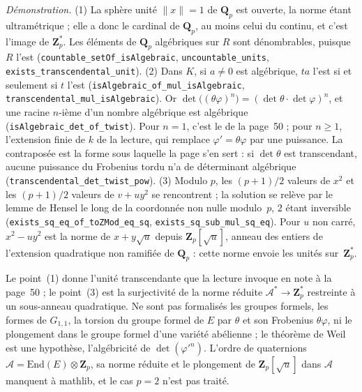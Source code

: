{\small \emph{Démonstration.} (1) La sphère unité $\lVert x \rVert = 1$ de $\mathbf Q_p$ est ouverte, la norme étant ultramétrique ; elle a donc le cardinal de $\mathbf Q_p$, au moins celui du continu, et c'est l'image de $\mathbf Z_p^*$. Les éléments de $\mathbf Q_p$ algébriques sur $R$ sont dénombrables, puisque $R$ l'est (\texttt{countable\_setOf\_isAlgebraic}, \texttt{uncountable\_units}, \texttt{exists\_transcendental\_unit}). (2) Dans $K$, si $a \neq 0$ est algébrique, $ta$ l'est si et seulement si $t$ l'est (\texttt{isAlgebraic\_of\_mul\_isAlgebraic}, \texttt{transcendental\_mul\_isAlgebraic}). Or $\det\bigl((\theta\varphi)^n\bigr) = (\det\theta \cdot \det\varphi)^n$, et une racine $n$-ième d'un nombre algébrique est algébrique (\texttt{isAlgebraic\_det\_of\_twist}). Pour $n = 1$, c'est le  de la page~50 ; pour $n \geq 1$, l'extension finie de $k$ de la lecture, qui remplace $\varphi' = \theta\varphi$ par une puissance. La contraposée est la forme sous laquelle la page s'en sert : si $\det\theta$ est transcendant, aucune puissance du Frobenius tordu n'a de déterminant algébrique (\texttt{transcendental\_det\_twist\_pow}). (3) Modulo $p$, les $(p+1)/2$ valeurs de $x^2$ et les $(p+1)/2$ valeurs de $v + u y^2$ se rencontrent ; la solution se relève par le lemme de Hensel le long de la coordonnée non nulle modulo~$p$, $2$ étant inversible (\texttt{exists\_sq\_eq\_of\_toZMod\_eq\_sq}, \texttt{exists\_sq\_sub\_mul\_sq\_eq}). Pour $u$ non carré, $x^2 - u y^2$ est la norme de $x + y\sqrt u$ depuis $\mathbf Z_p[\sqrt u]$, anneau des entiers de l'extension quadratique non ramifiée de $\mathbf Q_p$ : cette norme envoie les unités sur~$\mathbf Z_p^*$.

Le point~(1) donne l'unité transcendante que la lecture invoque en note à la page~50 ; le point~(3) est la surjectivité de la norme réduite $\mathcal A^* \to \mathbf Z_p^*$ restreinte à un sous-anneau quadratique. Ne sont pas formalisés les groupes formels, les formes de $G_{1,1}$, la torsion du groupe formel de $E$ par $\theta$ et son Frobenius $\theta\varphi$, ni le plongement dans le groupe formel d'une variété abélienne ; le théorème de Weil est une hypothèse, l'algébricité de $\det(\varphi'^n)$. L'ordre de quaternions $\mathcal A = \mathrm{End}(E) \otimes \mathbf Z_p$, sa norme réduite et le plongement de $\mathbf Z_p[\sqrt u]$ dans $\mathcal A$ manquent à mathlib, et le cas $p = 2$ n'est pas traité.\par}

